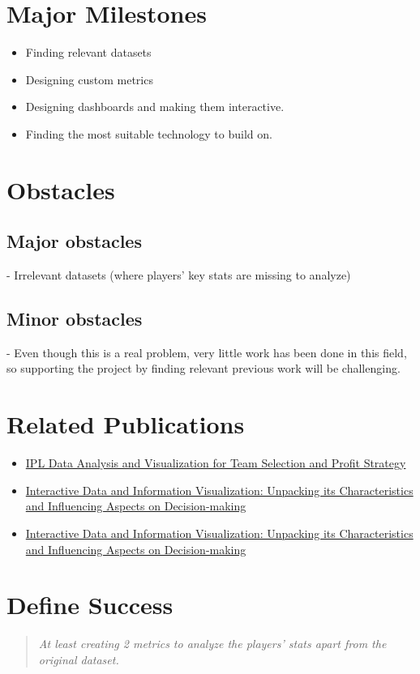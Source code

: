 \documentclass{proc}
\begin{document}
\section{Major Milestones}
\begin{itemize}
    \item Finding relevant datasets
    \item Designing custom metrics
    \item Designing dashboards and making them interactive.
    \item Finding the most suitable technology to build on.
\end{itemize}

\section{Obstacles}

\subsection{Major obstacles} %
- Irrelevant datasets (where players' key stats are missing to analyze)

\subsection{Minor obstacles}
- Even though this is a real problem, very little work has been done in this field, so supporting the project by finding relevant previous work will be challenging.


\section{Related Publications}
\begin{itemize}
    \item \href{https://ieeexplore.ieee.org/document/10083736}{IPL Data Analysis and Visualization for Team Selection and Profit Strategy}
    \item \href{https://www.frontiersin.org/articles/10.3389/fcomp.2021.758406/full}{Interactive Data and Information Visualization: Unpacking its Characteristics and Influencing Aspects on Decision-making}
    \item \href{https://aisel.aisnet.org/pajais/vol11/iss4/4/}{Interactive Data and Information Visualization: Unpacking its Characteristics and Influencing Aspects on Decision-making}
\end{itemize}

\section{Define Success}
\begin{quote}
\textit{At least creating 2 metrics to analyze the players' stats apart from the original dataset.}
\end{quote}



\end{document}
